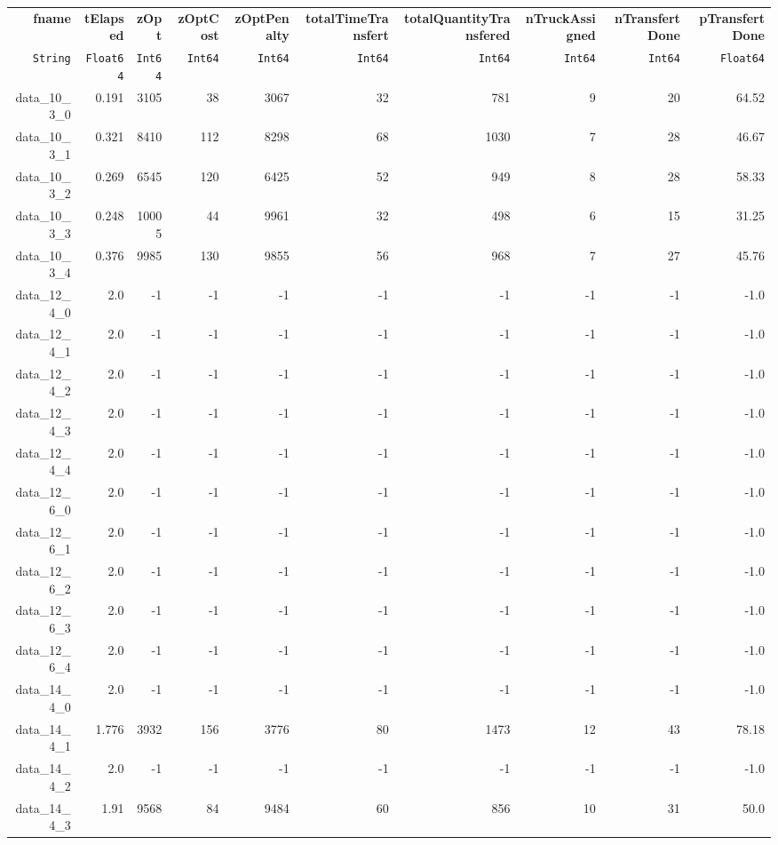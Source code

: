 \begin{tabular}{rrrrrrrrrr}
  \hline
  \textbf{fname} & \textbf{tElapsed} & \textbf{zOpt} & \textbf{zOptCost} & \textbf{zOptPenalty} & \textbf{totalTimeTransfert} & \textbf{totalQuantityTransfered} & \textbf{nTruckAssigned} & \textbf{nTransfertDone} & \textbf{pTransfertDone} \\
  \texttt{String} & \texttt{Float64} & \texttt{Int64} & \texttt{Int64} & \texttt{Int64} & \texttt{Int64} & \texttt{Int64} & \texttt{Int64} & \texttt{Int64} & \texttt{Float64} \\\hline
  data\_10\_3\_0 & 0.191 & 3105 & 38 & 3067 & 32 & 781 & 9 & 20 & 64.52 \\
  data\_10\_3\_1 & 0.321 & 8410 & 112 & 8298 & 68 & 1030 & 7 & 28 & 46.67 \\
  data\_10\_3\_2 & 0.269 & 6545 & 120 & 6425 & 52 & 949 & 8 & 28 & 58.33 \\
  data\_10\_3\_3 & 0.248 & 10005 & 44 & 9961 & 32 & 498 & 6 & 15 & 31.25 \\
  data\_10\_3\_4 & 0.376 & 9985 & 130 & 9855 & 56 & 968 & 7 & 27 & 45.76 \\
  data\_12\_4\_0 & 2.0 & -1 & -1 & -1 & -1 & -1 & -1 & -1 & -1.0 \\
  data\_12\_4\_1 & 2.0 & -1 & -1 & -1 & -1 & -1 & -1 & -1 & -1.0 \\
  data\_12\_4\_2 & 2.0 & -1 & -1 & -1 & -1 & -1 & -1 & -1 & -1.0 \\
  data\_12\_4\_3 & 2.0 & -1 & -1 & -1 & -1 & -1 & -1 & -1 & -1.0 \\
  data\_12\_4\_4 & 2.0 & -1 & -1 & -1 & -1 & -1 & -1 & -1 & -1.0 \\
  data\_12\_6\_0 & 2.0 & -1 & -1 & -1 & -1 & -1 & -1 & -1 & -1.0 \\
  data\_12\_6\_1 & 2.0 & -1 & -1 & -1 & -1 & -1 & -1 & -1 & -1.0 \\
  data\_12\_6\_2 & 2.0 & -1 & -1 & -1 & -1 & -1 & -1 & -1 & -1.0 \\
  data\_12\_6\_3 & 2.0 & -1 & -1 & -1 & -1 & -1 & -1 & -1 & -1.0 \\
  data\_12\_6\_4 & 2.0 & -1 & -1 & -1 & -1 & -1 & -1 & -1 & -1.0 \\
  data\_14\_4\_0 & 2.0 & -1 & -1 & -1 & -1 & -1 & -1 & -1 & -1.0 \\
  data\_14\_4\_1 & 1.776 & 3932 & 156 & 3776 & 80 & 1473 & 12 & 43 & 78.18 \\
  data\_14\_4\_2 & 2.0 & -1 & -1 & -1 & -1 & -1 & -1 & -1 & -1.0 \\
  data\_14\_4\_3 & 1.91 & 9568 & 84 & 9484 & 60 & 856 & 10 & 31 & 50.0 \\

\end{tabular}
